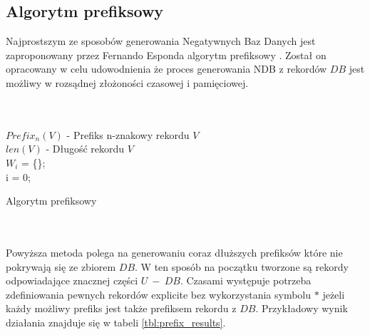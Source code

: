 \subsection{Algorytm prefiksowy}
\label{sec:prefix-alg}
Najprostszym ze sposobów generowania Negatywnych Baz Danych jest zaproponowany przez Fernando Esponda algorytm prefiksowy \cite{NRI-Esponda, Esponda2004EnhancingPT}. Został on opracowany w celu udowodnienia że proces generowania NDB z rekordów $DB$ jest możliwy w rozsądnej złożoności czasowej i pamięciowej.
\\\\\\
\begin{algorithm}[H]
    \SetAlgoLined
    
    $Prefix_n(V)$ - Prefiks n-znakowy rekordu $V$\\
    $len(V)$ - Długość rekordu $V$\\
    $W_i$ = \{\};\\
    i = 0;\\
    
    \caption{Algorytm prefiksowy}
    \label{alg:prefix}
\end{algorithm}
~\\\\


Powyższa metoda polega na generowaniu coraz dłuższych prefiksów które nie pokrywają się ze zbiorem $DB$.
W ten sposób na początku tworzone są rekordy odpowiadające znacznej części $U~-~DB$. Czasami występuje potrzeba zdefiniowania pewnych rekordów explicite bez wykorzystania symbolu $*$ jeżeli każdy możliwy prefiks jest także prefiksem rekordu z $DB$. 
Przykładowy wynik działania znajduje się w tabeli \ref{tbl:prefix_results}.

